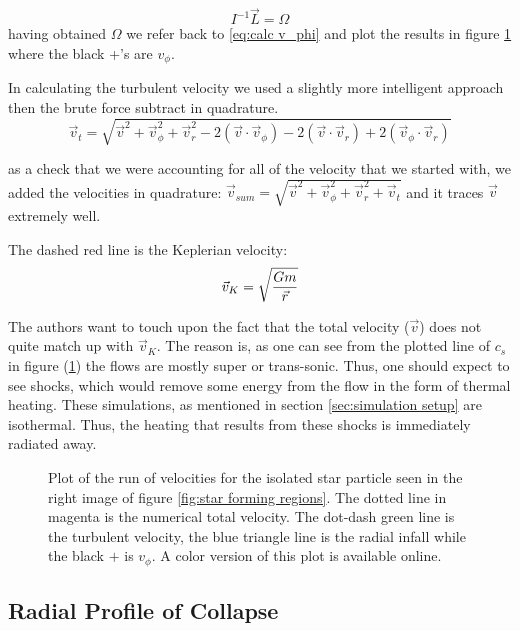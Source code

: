 \documentclass{emulateapj}
\newcommand{\be}{\begin{equation}}
\newcommand{\ee}{\end{equation}}
\begin{document}
\be
I^{-1}\vec{L} = \Omega
\label{eq:Obtain Omega}
\ee
having obtained $\Omega$ we refer back to \ref{eq:calc v_phi} and plot the results in figure \ref{fig:quad3_320_velocity} where the black +'s are $v_{\phi}$.

In calculating the turbulent velocity we used a slightly more intelligent approach then the brute force subtract in quadrature.
\be
\vec{v}_{t} = \sqrt{\vec{v}^2 + \vec{v}_{\phi}^2 + \vec{v}_{r}^2 - 2(\vec{v} \cdot \vec{v}_{\phi}) - 2(\vec{v} \cdot \vec{v}_{r}) + 2(\vec{v}_{\phi} \cdot \vec{v}_{r})}
\label{eq:Vrms subtraction}
\ee

as a check that we were accounting for all of the velocity that we started with, we added the velocities in quadrature: $\vec{v}_{sum} = \sqrt{\vec{v}^2 + \vec{v}_{\phi}^2 + \vec{v}_{r}^2 + \vec{v}_{t}}$ and it traces $\vec{v}$ extremely well.

The dashed red line is the Keplerian velocity:
\be
\vec{v}_{K} = \sqrt{G m \over \vec{r}}
\label{eq:Kepler velocity}
\ee

The authors want to touch upon the fact that the total velocity ($\vec{v}$) does not quite match up with $\vec{v}_{K}$. The reason is, as one can see from the plotted line of $c_s$ in figure (\ref{fig:quad3_320_velocity}) the flows are mostly super or trans-sonic. Thus, one should expect to see shocks, which would remove some energy from the flow in the form of thermal heating. These simulations, as mentioned in section \ref{sec:simulation setup} are isothermal. Thus, the heating that results from these shocks is immediately radiated away.

%


\begin{figure}
\caption{Plot of the run of velocities for the isolated star particle seen in the right image of figure \ref{fig:star forming regions}. The dotted line in magenta is the numerical total velocity. The dot-dash green line is the turbulent velocity, the blue triangle line is the radial infall while the black $+$ is $v_{\phi}$. A color version of this plot is available online.
\label{fig:quad3_320_velocity}}
\end{figure}

\subsection{Radial Profile of Collapse}
\end{document}
